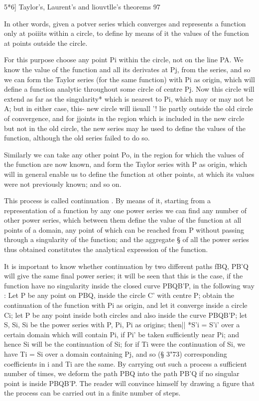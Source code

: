 {{5*6] Taylor's, Laurent's and liouvtlle's theorems 97

In other words, given a potver series which converges and represents a
function only at poiiits within a circle, to define hy means of it the
values of the function at points outside the circle.

For this purpose choose any point Pi within the circle, not on the
line PA. We know the value of the function and all its derivates at
Pj, from the series, and so we can form the Taylor series (for the
same function) with Pi as origin, which will define a function
analytic throughout some circle of centre Pj. Now this circle will
extend as far as the singularity* which is nearest to Pi, which may or
may not be A; but in either case, this- new circle will iisuall '!
lie partly outside the old circle of convergence, and for jjoints in
the region which is included in the new circle but not in the old
circle, the new series may he used to define the values of the
function, although the old series failed to do so.

Similarly we can take any other point Po, in the region for which the
values of the function are now known, and form the Taylor series with
P as origin, which will in general enable us to define the function at
other points, at which its values were not previously known; and so
on.

This process is called continuation . By means of it, starting from a
representation of a function by any one power series we can find any
number of other power series, which between them define the value of
the function at all points of a domain, any point of which can be
reached from P without passing through a singularity of the function;
and the aggregate § of all the power series thus obtained constitutes
the analytical expression of the function.

It is important to know whether continuation by two different paths
fBQ, PB'Q will give the same final power series; it will be seen that
this is the case, if the function have no singularity inside the
closed curve PBQB'P, in the following way : Let P be any point on PBQ,
inside the circle C' with centre P; obtain the continuation of the
function with Pi as origin, and let it converge inside a circle Ci;
let P be any point inside both circles and also inside the curve
PBQB'P; let S, Si, Si be the power series with P, Pi, Pi as origins;
then|| *S'i = S'i' over a certain domain which will contain Pi, if Pi'
be taken sufficiently near Pi; and hence Si will be the continuation
of Si; for if Ti were the continuation of Si, we have Ti = Si over a
domain containing Pj, and so (§ 3"73) corresponding coefficients in i
and Ti are the same. By carrying out such a process a sufficient
number of times, we deform the path PBQ into the path PB'Q if no
singular point is inside PBQB'P. The reader will convince himself by
drawing a figure that the process can be carried out in a finite
number of steps.

}}
